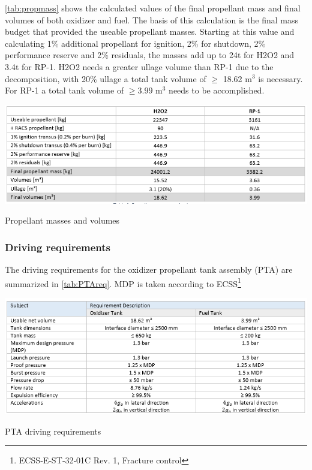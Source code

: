 \autoref{tab:propmass} shows the calculated values of the final propellant mass and final volumes of both oxidizer and fuel. The basis of this calculation is the final mass budget that provided the useable propellant masses. Starting at this value and calculating 1\% additional propellant for ignition, 2\% for shutdown, 2\% performance reserve and 2\% residuals, the masses add up to 24t for H2O2 and 3.4t for RP-1. H2O2 needs a greater ullage volume than RP-1 due to the decomposition, with 20\% ullage a total tank volume of $\geq$ 18.62 m$^3$ is necessary. For RP-1 a total tank volume of  $\geq3.99$ m$^3$ needs to be accomplished.
\begin{table}[H]
    \centering
    \includegraphics[width = \linewidth]{propmassvol}
    \caption{Propellant masses and volumes}
    \label{tab:propmass}
\end{table}{}
\subsubsection{Driving requirements}
The driving requirements for the oxidizer propellant tank assembly (PTA) are summarized in \autoref{tab:PTAreq}. MDP is taken according to ECSS\footnote{ECSS‐E‐ST‐32‐01C Rev. 1, Fracture control}
\begin{table}[H]
    \centering
    \includegraphics[width = \linewidth]{ptareq}
    \caption{PTA driving requirements}
    \label{tab:PTAreq}
\end{table}{}\pagebreak
